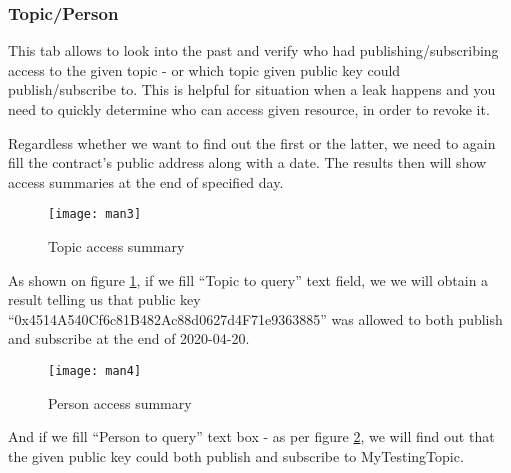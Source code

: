 \subsubsection{Topic/Person}
This tab allows to look into the past and verify who had publishing/subscribing access to the given topic - or which topic given public key could publish/subscribe to. This is helpful for situation when a leak happens and you need to quickly determine who can access given resource, in order to revoke it.

Regardless whether we want to find out the first or the latter, we need to again fill the contract's public address along with a date. The results then will show access summaries at the end of specified day.

\begin{figure}[h]
    \centering
    \texttt{[image: man3]}
    \caption{Topic access summary}
    \label{fig:man3}
\end{figure}

As shown on figure \ref{fig:man3}, if we fill ``Topic to query'' text field, we we will obtain a result telling us that public key ``0x4514A540Cf6c81B482Ac88d0627d4F71e9363885'' was allowed to both publish and subscribe at the end of 2020-04-20.

\begin{figure}[h]
    \centering
    \texttt{[image: man4]}
    \caption{Person access summary}
    \label{fig:man4}
\end{figure}

And if we fill ``Person to query'' text box - as per figure \ref{fig:man4}, we will find out that the given public key could both publish and subscribe to MyTestingTopic.
